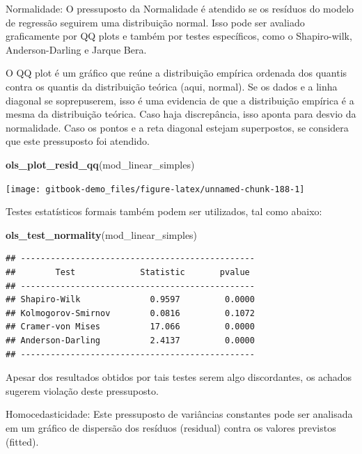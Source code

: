 \documentclass[
]{book}
\newenvironment{Shaded}{\begin{snugshade}}{\end{snugshade}}
\newcommand{\KeywordTok}[1]{\textcolor[rgb]{0.13,0.29,0.53}{\textbf{#1}}}
\newcommand{\NormalTok}[1]{#1}
\begin{document}
Normalidade: O pressuposto da Normalidade é atendido se os resíduos do modelo de regressão seguirem uma distribuição normal. Isso pode ser avaliado graficamente por QQ plots e também por testes específicos, como o Shapiro-wilk, Anderson-Darling e Jarque Bera.

O QQ plot é um gráfico que reúne a distribuição empírica ordenada dos quantis contra os quantis da distribuição teórica (aqui, normal). Se os dados e a linha diagonal se soprepuserem, isso é uma evidencia de que a distribuição empírica é a mesma da distribuição teórica. Caso haja discrepância, isso aponta para desvio da normalidade. Caso os pontos e a reta diagonal estejam superpostos, se considera que este pressuposto foi atendido.

\begin{Shaded}
\begin{Highlighting}[]
\KeywordTok{ols_plot_resid_qq}\NormalTok{(mod_linear_simples)}
\end{Highlighting}
\end{Shaded}

\begin{center}\texttt{[image: gitbook-demo\_files/figure-latex/unnamed-chunk-188-1]} \end{center}

Testes estatísticos formais também podem ser utilizados, tal como abaixo:

\begin{Shaded}
\begin{Highlighting}[]
\KeywordTok{ols_test_normality}\NormalTok{(mod_linear_simples)}
\end{Highlighting}
\end{Shaded}

\begin{verbatim}
## -----------------------------------------------
##        Test             Statistic       pvalue  
## -----------------------------------------------
## Shapiro-Wilk              0.9597         0.0000 
## Kolmogorov-Smirnov        0.0816         0.1072 
## Cramer-von Mises          17.066         0.0000 
## Anderson-Darling          2.4137         0.0000 
## -----------------------------------------------
\end{verbatim}

Apesar dos resultados obtidos por tais testes serem algo discordantes, os achados sugerem violação deste pressuposto.

Homocedasticidade: Este pressuposto de variâncias constantes pode ser analisada em um gráfico de dispersão dos resíduos (residual) contra os valores previstos (fitted).
\end{document}
